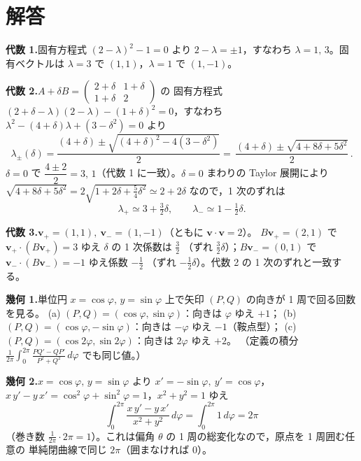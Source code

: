 \documentclass[dvipdfmx, uplatex]{jsarticle}
\theoremstyle{definition}
\begin{document}
\bigskip
\section*{解答}

\noindent\textbf{代数 1.}\quad 固有方程式 $(2-\lambda)^2-1=0$ より $2-\lambda=\pm1$，すなわち
$\boxed{\lambda=1,\,3}$。固有ベクトルは $\lambda=3$ で $\boxed{(1,1)}$，$\lambda=1$ で $\boxed{(1,-1)}$。

\smallskip
\noindent\textbf{代数 2.}\quad $A+\delta B=\begin{pmatrix}2+\delta&1+\delta\\ 1+\delta&2\end{pmatrix}$ の
固有方程式 $(2+\delta-\lambda)(2-\lambda)-(1+\delta)^2=0$，すなわち $\lambda^2-(4+\delta)\lambda+(3-\delta^2)=0$ より
\[
    \lambda_\pm(\delta)=\frac{(4+\delta)\pm\sqrt{(4+\delta)^2-4(3-\delta^2)}}{2}
    =\boxed{\,\frac{(4+\delta)\pm\sqrt{4+8\delta+5\delta^2}}{2}\,}.
\]
$\delta=0$ で $\dfrac{4\pm2}{2}=3,\,1$（代数 1 に一致）。$\delta=0$ まわりの Taylor 展開により
$\sqrt{4+8\delta+5\delta^2}=2\sqrt{1+2\delta+\tfrac54\delta^2}\simeq2+2\delta$ なので，1 次のずれは
\[
    \boxed{\lambda_+\simeq3+\tfrac32\delta},\qquad \boxed{\lambda_-\simeq1-\tfrac12\delta}.
\]

\smallskip
\noindent\textbf{代数 3.}\quad $\bm v_+=(1,1),\ \bm v_-=(1,-1)$（ともに $\bm v\cdot\bm v=2$）。
$B\bm v_+=(2,1)$ で $\bm v_+\cdot(B\bm v_+)=3$ ゆえ $\delta$ の 1 次係数は $\boxed{\tfrac32}$
（ずれ $\tfrac32\delta$）；$B\bm v_-=(0,1)$ で $\bm v_-\cdot(B\bm v_-)=-1$ ゆえ係数 $\boxed{-\tfrac12}$
（ずれ $-\tfrac12\delta$）。代数 2 の 1 次のずれと一致する。

\bigskip
\noindent\textbf{幾何 1.}\quad 単位円 $x=\cos\varphi,\,y=\sin\varphi$ 上で矢印 $(P,Q)$ の向きが 1 周で回る回数を見る。
(a) $(P,Q)=(\cos\varphi,\sin\varphi)$：向きは $\varphi$ ゆえ $\boxed{+1}$；
(b) $(P,Q)=(\cos\varphi,-\sin\varphi)$：向きは $-\varphi$ ゆえ $\boxed{-1}$（鞍点型）；
(c) $(P,Q)=(\cos2\varphi,\sin2\varphi)$：向きは $2\varphi$ ゆえ $\boxed{+2}$。
（定義の積分 $\tfrac1{2\pi}\int_0^{2\pi}\tfrac{PQ'-QP'}{P^2+Q^2}\,d\varphi$ でも同じ値。）

\smallskip
\noindent\textbf{幾何 2.}\quad $x=\cos\varphi,\,y=\sin\varphi$ より $x'=-\sin\varphi,\ y'=\cos\varphi$，
$x\,y'-y\,x'=\cos^2\varphi+\sin^2\varphi=1$，$x^2+y^2=1$ ゆえ
\[
    \int_0^{2\pi}\frac{x\,y'-y\,x'}{x^2+y^2}\,d\varphi=\int_0^{2\pi}1\,d\varphi=\boxed{2\pi}
\]
（巻き数 $\tfrac1{2\pi}\cdot2\pi=1$）。これは偏角 $\theta$ の 1 周の総変化なので，原点を 1 周囲む任意の
単純閉曲線で同じ $2\pi$（囲まなければ $0$）。
\end{document}
